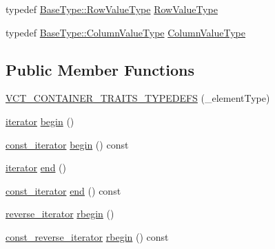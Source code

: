 \begin{DoxyCompactItemize}
\item 
typedef \hyperlink{classvct_fixed_size_const_matrix_base_a085661aab062c6d975e558be1cfae2d7}{Base\+Type\+::\+Row\+Value\+Type} \hyperlink{classvct_fixed_size_matrix_base_a63ea40ab7299ff1f714ba077ef1fe568}{Row\+Value\+Type}
\item 
typedef \hyperlink{classvct_fixed_size_const_matrix_base_a1c4e4fda1ae603282d28745d3ec78493}{Base\+Type\+::\+Column\+Value\+Type} \hyperlink{classvct_fixed_size_matrix_base_a7420316140dde042d228bc02fb98d4a7}{Column\+Value\+Type}
\end{DoxyCompactItemize}
\subsection*{Public Member Functions}
\begin{DoxyCompactItemize}
\item 
\hyperlink{classvct_fixed_size_matrix_base_a716954f029505167d26352caabc507a1}{V\+C\+T\+\_\+\+C\+O\+N\+T\+A\+I\+N\+E\+R\+\_\+\+T\+R\+A\+I\+T\+S\+\_\+\+T\+Y\+P\+E\+D\+E\+F\+S} (\+\_\+element\+Type)
\item 
\hyperlink{classvct_fixed_size_const_matrix_base_a4a1ca42894c9dac29243adf6ac266205}{iterator} \hyperlink{classvct_fixed_size_matrix_base_ad871cc7962c88a2414d72e1538b3e674}{begin} ()
\item 
\hyperlink{classvct_fixed_size_const_matrix_base_a896eacc5ccf7915b3e109bf9dbded884}{const\+\_\+iterator} \hyperlink{classvct_fixed_size_matrix_base_a2b4acb2bfacb2b898129f2be525ef442}{begin} () const 
\item 
\hyperlink{classvct_fixed_size_const_matrix_base_a4a1ca42894c9dac29243adf6ac266205}{iterator} \hyperlink{classvct_fixed_size_matrix_base_aaf195ed7f31484143ba4b62e1ec6d1c0}{end} ()
\item 
\hyperlink{classvct_fixed_size_const_matrix_base_a896eacc5ccf7915b3e109bf9dbded884}{const\+\_\+iterator} \hyperlink{classvct_fixed_size_matrix_base_ac0c21f75b0523789faac881def24a8d2}{end} () const 
\item 
\hyperlink{classvct_fixed_size_const_matrix_base_a7611e666969b09bd846c46a1a85401b0}{reverse\+\_\+iterator} \hyperlink{classvct_fixed_size_matrix_base_ad5a7511aafb636db3f1199b8301e6059}{rbegin} ()
\item 
\hyperlink{classvct_fixed_size_const_matrix_base_a86918b3da51e15dce72b62abdc6378fa}{const\+\_\+reverse\+\_\+iterator} \hyperlink{classvct_fixed_size_matrix_base_a1a5513f5ef4414ccd75b300e797269dc}{rbegin} () const 
\item 

\end{DoxyCompactItemize}
